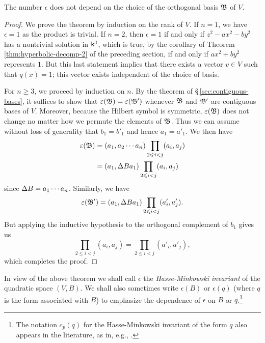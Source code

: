 \begin{theorem}{\normalfont\cite[pp.~35--36]{serre2012course}} The number
    \(\epsilon\) does not depend on the choice of the orthogonal basis
    \(\mathfrak{B}\) of \(V\).
\end{theorem}

\begin{proof}
    We prove the theorem by induction on the rank of \(V\). If \(n = 1\), we
    have \(\epsilon = 1\) as the product is trivial. If \(n = 2\), then
    \(\epsilon = 1\) if and only if \(z^2 - ax^2 - by^2\) has a nontrivial
    solution in \(\mathsf{k}^3\), which is true, by the corollary of Theorem
    \ref{thm:hyperbolic-decomp-2} of the preceding section, if and only if
    \(ax^2 + by^2\) represents \(1\). But this last statement implies that there
    exists a vector \(v \in V\) such that \(q(x) = 1\); this vector exists
    independent of the choice of basis.

    For \(n \geq 3\), we proceed by induction on \(n\). By the theorem of
    \S\,\ref{sec:contiguous-bases}, it suffices to show that \(\varepsilon(\mathfrak{B})
    = \varepsilon(\mathfrak{B}')\) whenever \(\mathfrak{B}\) and \(\mathfrak{B}'\) are contiguous
    bases of \(V\). Moreover, because the Hilbert symbol is symmetric,
    \(\varepsilon(\mathfrak{B})\) does not change no matter how we permute the elements
    of \(\mathfrak{B}\). Thus we can assume without loss of generality that \(b_1 =
    b'_1\) and hence \(a_1 = a'_1\). We then have
    \begin{align*}
        \varepsilon(\mathfrak{B})  &= (a_1, a_2 \cdots a_n) \prod_{2 \leqslant i <j} (a_i, a_j) \\
                                &= (a_1, {\Delta} B a_1) \prod_{2 \leqslant i <j} (a_i, a_j)
    \end{align*}
    since \({\Delta} B = a_1 \cdots a_n\). Similarly, we have
    \[
        \varepsilon(\mathfrak{B'}) = (a_1, {\Delta} B a_1) \prod_{2 \leqslant i <j} (a'_i, a'_j).
    \]
    But applying the inductive hypothesis to the orthogonal complement of
    \(b_1\) gives us
    \[
        \prod_{2 \leq i <j} (a_i, a_j) = \prod_{2 \leq i <j} (a'_i, a'_j),  
    \]
    which completes the proof.
\end{proof}

In view of the above theorem we shall call \(\epsilon\) the
\emph{Hasse-Minkowski invariant} of the
quadratic space \((V, B)\). We shall also sometimes write \(\epsilon(B)\) or
\(\epsilon(q)\) (where \(q\) is the form associated with \(B\)) to emphasize the
dependence of \(\epsilon\) on \(B\) or \(q\).\footnote{The notation \(c_p(q)\)
for the Hasse-Minkowski invariant of the form \(q\) also appears in the
literature, as in, e.g., \cite{jones1950arithmetic,cassels2008rational}.}

